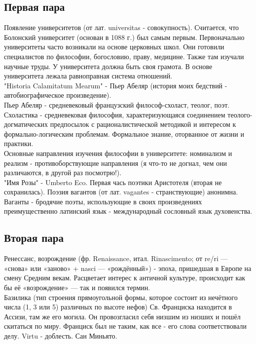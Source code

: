 \subsection{Первая пара}
Появление университетов (от лат. universitas - совокупность). Считается, что Болонский университет (основан в 1088 г.) был самым первым. Первоначально университеты часто возникали на основе церковных школ. Они готовили специалистов по философии, богословию, праву, медицине. Также там изучали научные труды. У университета должна быть своя грамота. В основе университета лежала равноправная система отношений. \\
"Historia Calamitatum Mearum" - Пьер Абеляр (история моих бедствий - автобиографическое произведение).\\
Пьер Абеляр - средневековый французский философ-схоласт, теолог, поэт.\\
Схоластика - средневековая философия, характеризующаяся соединением теолого-догматических предпосылок с рационалистической методикой и интересом к формально-логическим проблемам. Формальное знание, оторванное от жизни и практики.\\
Основные направления изучения философии в университете: номинализм и реализм - противоборствующие направления (я что-то не догнал, чем они различаются, в другой раз посмотрю!). \\
"Имя Розы" - Umberto Eco. Первая чась поэтики Аристотеля (вторая не сохранилась). Поэзия вагантов (от лат. vagantes - странствующие) анонимна. Ваганты - бродячие поэты, использующие в своих произведениях преимущественно латинский язык - международный сословный язык духовенства.
\subsection{Вторая пара}
Ренессанс, возрождение (фр. Renaissance, итал. Rinascimento; от re/ri — «снова» или «заново» + nasci — «рождённый») - эпоха, пришедшая в Европе на смену Средним векам. Расцветает интерес к античной культуре, происходит как бы её «возрождение» — так и появился термин.\\
Базилика (тип строения прямоугольной формы, которое состоит из нечётного числа (1, 3 или 5) различных по высоте нефов) Св. Франциска находится в Ассизи, там же его могила. Он провозгласил себя низшим из низших и пошёл скитаться по миру. Франциск был не таким, как все - его слова соответствовали делу. Virtu - доблесть. Сан Миньято.
